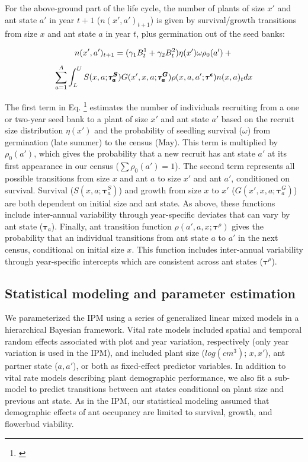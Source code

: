 \documentclass[11pt]{article}
\newcommand{\tom}[2]{{\color{red}{#1}}\footnote{\textit{\color{red}{#2}}}}
\begin{document}
For the above-ground part of the life cycle, the number of plants of size $x'$ and ant state $a'$ in year $t+1$ ($n(x',a')_{t+1}$) is given by survival/growth transitions from size $x$ and ant state $a$ in year $t$, plus germination out of the seed banks:
\begin{linenomath*}
	$$
	n(x',a')_{t+1} = (\gamma_1 B^1_{t} + \gamma_2 B^2_{t} ) \eta(x') \omega \rho_{0}(a')  + \\
	$$
	$$
	\sum_{a=1}^{A} \int_L^U S(x,a;\pmb{\tau^S_{a}}) G(x',x,a;\pmb{\tau^G_{a}}) \rho(x,a,a';\pmb{\tau^{\epsilon}}) n(x,a)_t dx \\
	$$
	\label{eqn:IPM2}
\end{linenomath*}

\noindent The first term in Eq. \tom{\ref{eqn:IPM2}}{We should label equations. I am not sure why the equation label is not working here and I did not try to figure it out. It is probably something with the linenomath formatting.} estimates the number of individuals recruiting from a one or two-year seed bank to a plant of size $x'$ and ant state $a'$ based on the recruit size distribution $\eta(x')$ and the probability of seedling survival ($\omega$) from germination (late summer) to the census (May).
This term is multiplied by $\rho_{0}(a')$, which gives the probability that a new recruit has ant state $a'$ at its first appearance in our census ($\sum\rho_{0}(a')=1$). 
The second term represents all possible transitions from size $x$ and ant $a$ to size $x'$ and ant $a'$, conditioned on survival. 
Survival ($S(x,a;\pmb{\tau}^S_{a})$) and growth from size $x$ to $x'$ ($G(x',x,a;\pmb{\tau}^G_{a})$) are both dependent on initial size and ant state. 
As above, these functions include inter-annual variability through year-specific deviates that can vary by ant state ($\pmb{\tau}_{a}$). 
Finally, ant transition function $\rho(a',a,x;\pmb{\tau}^{\rho})$ gives the probability that an individual transitions from ant state $a$ to $a'$ in the next census, conditional on initial size $x$. 
This function includes inter-annual variability through year-specific intercepts which are consistent across ant states ($\pmb{\tau}^\rho$).

\subsection*{Statistical modeling and parameter estimation}
We parameterized the IPM using a series of generalized linear mixed models in a hierarchical Bayesian framework. 
Vital rate models included spatial and temporal random effects associated with plot and year variation, respectively (only year variation is used in the IPM), and included plant size ($log(cm^3)$; $x,x'$), ant partner state ($a,a'$), or both as fixed-effect predictor variables. 
In addition to vital rate models describing plant demographic performance, we also fit a sub-model to predict transitions between ant states conditional on plant size and previous ant state. 
As in the IPM, our statistical modeling assumed that demographic effects of ant occupancy are limited to survival, growth, and flowerbud viability. 
\end{document}
